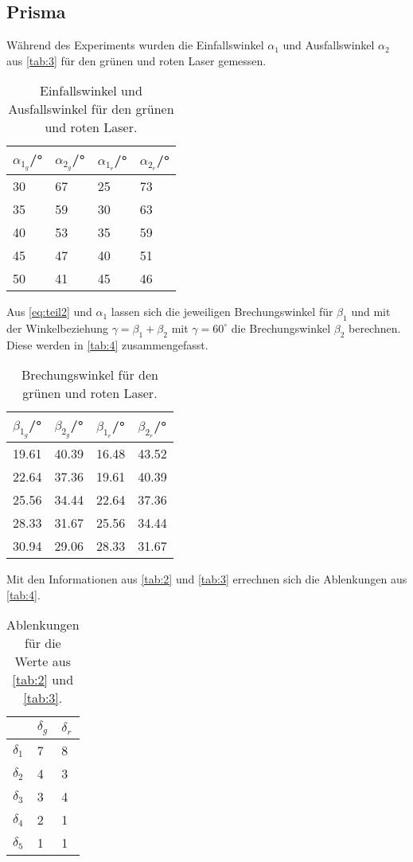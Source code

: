 \subsection{Prisma}
Während des Experiments wurden die Einfallswinkel $\alpha_1$ und Ausfallswinkel $\alpha_2$ aus \autoref{tab:3} für den grünen und roten Laser gemessen.
\begin{table}[H]
  \centering
  \caption{Einfallswinkel und Ausfallswinkel für den grünen und roten Laser.}
  \begin{tabular}{l|l|l|l}
  $\alpha_{1_g}$/° & $\alpha_{2_g}$/° & $\alpha_{1_r}$/° & $\alpha_{2_r}$/°\\\hline
  30 & 67 & 25 & 73\\
  35 & 59 & 30 & 63\\
  40 & 53 & 35 & 59\\
  45 & 47 & 40 & 51\\
  50 & 41 & 45 & 46\\\hline
  \end{tabular}
  \label{tab:3}
\end{table}
Aus \autoref{eq:teil2} und $\alpha_1$ lassen sich die jeweiligen Brechungswinkel für $\beta_1$ und mit der Winkelbeziehung $\gamma=\beta_1 +\beta_2$ mit $\gamma=60^\circ$ die Brechungswinkel $\beta_2$ berechnen. Diese werden in \autoref{tab:4} zusammengefasst.
\begin{table}[H]
  \centering
  \caption{Brechungswinkel für den grünen und roten Laser.}
  \begin{tabular}{l|l|l|l}
  $\beta_{1_g}$/° & $\beta_{2_g}$/° & $\beta_{1_r}$/° & $\beta_{2_r}$/°\\\hline
  19.61 & 40.39 & 16.48 & 43.52\\
  22.64 & 37.36 & 19.61 & 40.39\\
  25.56 & 34.44 & 22.64 & 37.36\\
  28.33 & 31.67 & 25.56 & 34.44\\
  30.94 & 29.06 & 28.33 & 31.67\\\hline
  \end{tabular}
  \label{tab:3}
\end{table}
Mit den Informationen aus \autoref{tab:2} und \autoref{tab:3} errechnen sich die Ablenkungen aus \autoref{tab:4}.
\begin{table}[H]
  \centering
  \caption{Ablenkungen für die Werte aus \autoref{tab:2} und \autoref{tab:3}.}
  \begin{tabular}{l|l|l}
  & $\delta_{g}$ & $\delta_{r}$\\\hline
  $\delta_{1}$ & 7 & 8\\
  $\delta_{2}$ & 4 & 3\\
  $\delta_{3}$ & 3 & 4\\
  $\delta_{4}$ & 2 & 1\\
  $\delta_{5}$ & 1 & 1\\\hline
  \end{tabular}
  \label{tab:4}
\end{table}

